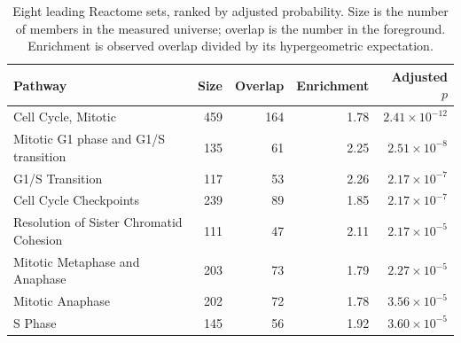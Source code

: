 \begin{table}[!htbp]
\centering\small
\caption{Eight leading Reactome sets, ranked by adjusted probability. Size is the number of members in the measured universe; overlap is the number in the foreground. Enrichment is observed overlap divided by its hypergeometric expectation.}
\label{tab:pathways}
\begin{tabularx}{\linewidth}{@{}>{\raggedright\arraybackslash}Xrrrr@{}}\toprule
Pathway & Size & Overlap & Enrichment & Adjusted $p$\\\midrule
Cell Cycle, Mitotic & 459 & 164 & 1.78 & $2.41\times10^{-12}$\\
Mitotic G1 phase and G1/S transition & 135 & 61 & 2.25 & $2.51\times10^{-8}$\\
G1/S Transition & 117 & 53 & 2.26 & $2.17\times10^{-7}$\\
Cell Cycle Checkpoints & 239 & 89 & 1.85 & $2.17\times10^{-7}$\\
Resolution of Sister Chromatid Cohesion & 111 & 47 & 2.11 & $2.17\times10^{-5}$\\
Mitotic Metaphase and Anaphase & 203 & 73 & 1.79 & $2.27\times10^{-5}$\\
Mitotic Anaphase & 202 & 72 & 1.78 & $3.56\times10^{-5}$\\
S Phase & 145 & 56 & 1.92 & $3.60\times10^{-5}$\\
\bottomrule\end{tabularx}
\end{table}

